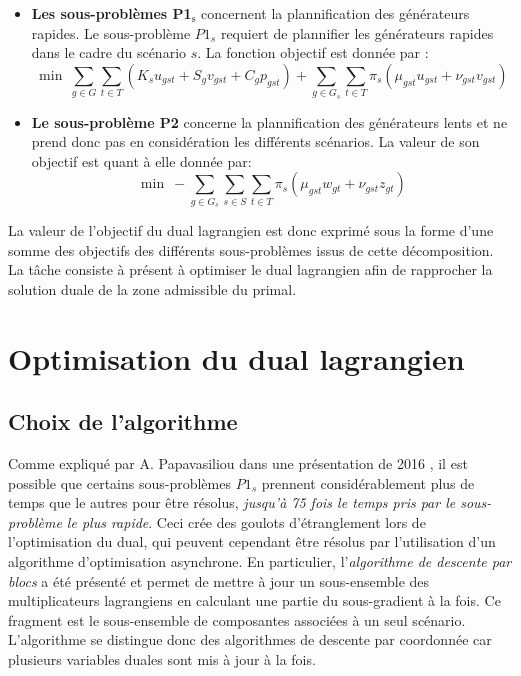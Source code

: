 \begin{itemize}
    \item \textbf{Les sous-problèmes P1$_{\text{s}}$} concernent la plannification des générateurs rapides.
    Le sous-problème $P1_s$ requiert de plannifier les générateurs rapides dans le cadre du scénario $s$.
    La fonction objectif est donnée par \citep{Papavasiliou2013}:
    \begin{equation}
        \min \ \sum\limits_{g \in G} \sum\limits_{t \in T} (K_s u_{gst} + S_g v_{gst} + C_g p_{gst}) + \sum\limits_{g \in G_s} \sum\limits_{t \in T} \pi_s (\mu_{gst} u_{gst} + \nu_{gst} v_{gst})
    \end{equation}
    \item \textbf{Le sous-problème P2} concerne la plannification des générateurs lents et ne prend donc pas
    en considération les différents scénarios. La valeur de son objectif est quant à elle donnée par:
    \begin{equation}
        \min \ - \sum\limits_{g \in G_s} \sum\limits_{s \in S} \sum\limits_{t \in T} \pi_s (\mu_{gst} w_{gt} + \nu_{gst} z_{gt})
    \end{equation}
\end{itemize}

La valeur de l'objectif du dual lagrangien est donc exprimé sous la forme d'une somme des objectifs des différents sous-problèmes
issus de cette décomposition. La tâche consiste à présent à optimiser le dual lagrangien afin de rapprocher la solution duale de la
zone admissible du primal.

\section{Optimisation du dual lagrangien}

\subsection{Choix de l'algorithme}

Comme expliqué par A. Papavasiliou dans une présentation de 2016 \citep{Asynchronous},
il est possible que certains sous-problèmes $P1_s$ prennent considérablement plus de temps que le autres pour être résolus, \textit{jusqu'à
75 fois le temps pris par le sous-problème le plus rapide}. Ceci crée des goulots d'étranglement lors de l'optimisation du dual,
qui peuvent cependant être résolus par l'utilisation d'un algorithme d'optimisation asynchrone.
En particulier, l'\textit{algorithme de descente par blocs} a été présenté et permet de mettre à jour un sous-ensemble des multiplicateurs
lagrangiens en calculant une partie du sous-gradient à la fois. Ce fragment est le sous-ensemble de composantes associées à un seul
scénario. L'algorithme se distingue donc des algorithmes de descente par coordonnée car plusieurs variables duales sont mis à jour
à la fois.

